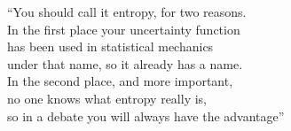 %
\def\A{\mathcal{A}}
\def\B{\mathcal{B}}
\def\C{\mathcal{C}}
\def\D{\mathcal{D}}
\def\E{\mathcal{E}}
\def\H{\mathcal{H}}
\def\P{\mathcal{P}}
\def\X{\mathcal{X}}
\def\Y{\mathcal{Y}}
%
\def\Cset{\mathbb{C}}
\def\Nset{\mathbb{N}}
\def\Rset{\mathbb{R}}
\def\Zset{\mathbb{Z}}
%
\def\Esp{\operatorname{E}}
\def\e{\operatorname{e}}
\def\Jac{\operatorname{J}}
\def\Hess{\mathcal{H}}
\def\Tr{\operatorname{Tr}}
\def\diag{\operatorname{diag}}
\def\Gauss{\mathcal{N}}
\def\argmax{\operatorname*{argm\acute{a}x}}
%
\def\un{\mathbbm{1}}
\def\opt{\mathrm{opt}}
\def\sh{\mathrm{sh}}
%
\def\ie{{\it i. e.,}\xspace}
%
%
\newenvironment{propiedades}
{\begin{enumerate}[label={[P\arabic*]}]\setcounter{enumi}{\value{propiedad}}}
{\setcounter{propiedad}{\value{enumi}}\end{enumerate}}
%
\newenvironment{propiedadesC}
{\begin{enumerate}[label={[P'\arabic*]}]}
{\end{enumerate}}





\begin{epigrafe}
  ``You should call it entropy, for two reasons.\\
  In the first place your  uncertainty function\\
  has been used  in statistical mechanics\\
  under that  name, so it already  has a name.\\
  In the  second place, and more  important,\\
  no one knows what entropy really is,\\
  so in a  debate you will always have  the advantage''
\end{epigrafe}



\label{s:SZ:Introduccion}

